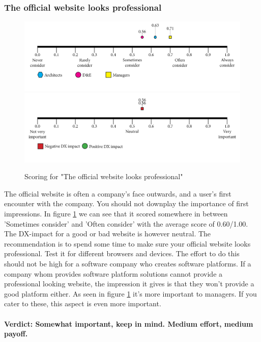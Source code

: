 \documentclass{article}
\begin{document}
\subsubsection{The official website looks professional}
\begin{figure}[H]
\centering
\includegraphics[width=\linewidth]{scorelines/aspect8.png}
\includegraphics[width=\linewidth]{dxscorelines/dxaspect8.png}
\caption{Scoring for "The official website looks professional"}
\label{fig:aspect8}
\end{figure}
The official website is often a company's face outwards, and a user's first encounter with the company. You should not downplay the importance of first impressions. In figure \ref{fig:aspect8} we can see that it scored somewhere in between 'Sometimes consider' and 'Often consider' with the average score of 0.60/1.00. The DX-impact for a good or bad website is however neutral. The recommendation is to spend some time to make sure your official website looks professional. Test it for different browsers and devices. The effort to do this should not be high for a software company who creates software platforms. If a company whom provides software platform solutions cannot provide a professional looking website, the impression it gives is that they won't provide a good platform either. As seen in figure \ref{fig:aspect8} it's more important to managers. If you cater to these, this aspect is even more important.
\\ \\
\textbf{Verdict: Somewhat important, keep in mind. Medium effort, medium payoff.}
\end{document}
